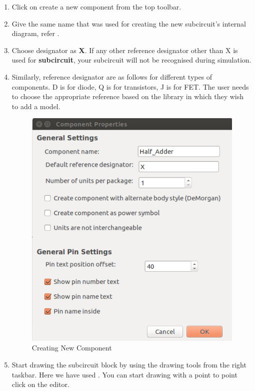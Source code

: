 \begin{itemize}
\begin{enumerate}
        \item Click on create a new component from the top toolbar.
        \item Give the same name that was used for creating the new subcircuit's internal diagram, refer .
        \item Choose designator as \textbf{X}. If any other reference designator other than X is used for \textbf{subcircuit}, your subcircuit will not be recognised during simulation.
        \item Similarly, reference designator are as follows for different types of components. D is for diode, Q is for transistors, J is for FET. The user needs to choose the appropriate reference based on the library in which they wish to add a model. 
            \begin{figure}[!htp]
                \centering         
                \includegraphics[width =\smfig]{subcktnewcomp.png}
                \caption{Creating New Component}
                \label{subcktnewcomp}
            \end{figure}


        \item Start drawing the subcircuit block by using the drawing tools from the right taskbar. Here we have used {}. You can start drawing with a point to point click on the editor.
        

\end{enumerate}
\end{itemize}
